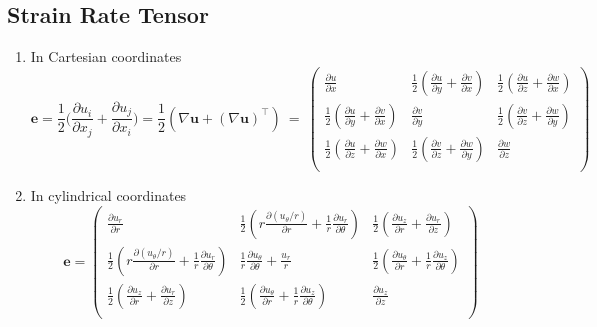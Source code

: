 \documentclass[a4paper]{article}
\begin{document}
\subsection{Strain Rate Tensor}
\begin{enumerate}
    \item In Cartesian coordinates
      \begin{equation*}
          \mathbf{e} = \frac{1}{2}\bigg(\frac{\partial u_{i}}{\partial x_{j}} + \frac{\partial u_{j}}{\partial x_{i}}\bigg)=\frac{1}{2}(\nabla \mathbf{u}+(\nabla \mathbf{u})^\intercal) \ = \
          \begin{pmatrix}
          \frac{\partial u}{\partial x} & \frac{1}{2}(\frac{\partial u}{\partial y}+\frac{\partial v}{\partial x}) & \frac{1}{2}(\frac{\partial u}{\partial z}+\frac{\partial w}{\partial x})\\[0.5em]
          
          \frac{1}{2}(\frac{\partial u}{\partial y}+\frac{\partial v}{\partial x}) & \frac{\partial v}{\partial y}  & \frac{1}{2}(\frac{\partial v}{\partial z}+\frac{\partial w}{\partial y})\\[0.5em]
          
          \frac{1}{2}(\frac{\partial u}{\partial z}+\frac{\partial w}{\partial x}) & \frac{1}{2}(\frac{\partial v}{\partial z}+\frac{\partial w}{\partial y})  & \frac{\partial w}{\partial z}\\
          \end{pmatrix}
      \end{equation*}
      
    \item In cylindrical coordinates
      \begin{equation*}
          \mathbf{e} = 
          \begin{pmatrix}
          \frac{\partial u_{r}}{\partial r} & \frac{1}{2}(r\frac{\partial (u_{\theta}/r)}{\partial r}+\frac{1}{r}\frac{\partial u_{r}}{\partial \theta}) & \frac{1}{2}(\frac{\partial u_{z}}{\partial r}+\frac{\partial u_{r}}{\partial z})\\[0.5em]
          
          \frac{1}{2}(r\frac{\partial (u_{\theta}/r)}{\partial r}+\frac{1}{r}\frac{\partial u_{r}}{\partial \theta}) & \frac{1}{r}\frac{\partial u_{\theta}}{\partial \theta}+\frac{u_{r}}{r} & \frac{1}{2}(\frac{\partial u_{\theta}}{\partial r}+\frac{1}{r}\frac{\partial u_{z}}{\partial \theta})\\[0.5em]
          
          \frac{1}{2}(\frac{\partial u_{z}}{\partial r}+\frac{\partial u_{r}}{\partial z}) & \frac{1}{2}(\frac{\partial u_{\theta}}{\partial r}+\frac{1}{r}\frac{\partial u_{z}}{\partial \theta})  & \frac{\partial u_{z}}{\partial z}\\
          \end{pmatrix}
      \end{equation*}
\end{enumerate}
\end{document}

